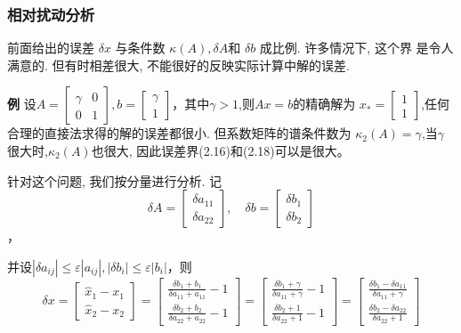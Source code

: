 \documentclass[12pt,a4paper]{article}
\begin{document}
\subsubsection{相对扰动分析}
前面给出的误差 $\delta x$ 与条件数 $\kappa(A), \delta A$和 $\delta b$ 成比例. 许多情况下, 这个界
是令人满意的. 但有时相差很大, 不能很好的反映实际计算中解的误差.

\begin{framed}
	{\bfseries 例} 设$A=\left[\begin{array}{ll}{\gamma} & {0} \\ {0} & {1}\end{array}\right], b=\left[\begin{array}{l}{\gamma} \\ {1}\end{array}\right]$，其中$\gamma > 1$,则$Ax = b$的精确解为
	$x_{*}=\left[\begin{array}{l}{1} \\ {1}\end{array}\right]$,任何合理的直接法求得的解的误差都很小. 但系数矩阵的谱条件数为 $\kappa_{2}(A)=\gamma$,当$\gamma$很大时,$\kappa_{2}(A)$也很大, 因此误差界(2.16)和(2.18)可以是很大。
	
	针对这个问题, 我们按分量进行分析. 记
	\begin{equation}
	\delta A=\left[\begin{array}{c}{\delta a_{11}} \\ {\delta a_{22}}\end{array}\right], \quad \delta b=\left[\begin{array}{c}{\delta b_{1}} \\ {\delta b_{2}}\end{array}\right]
	\end{equation}，
	
	并设$\left|\delta a_{i j}\right| \leq \varepsilon\left|a_{i j}\right|,\left|\delta b_{i}\right| \leq \varepsilon\left|b_{i}\right|$，则
	\begin{equation}
	\delta x=\left[\begin{array}{c}{\hat{x}_{1}-x_{1}} \\ {\hat{x}_{2}-x_{2}}\end{array}\right]=\left[\begin{array}{c}{\frac{\delta b_{1}+b_{1}}{\delta a_{11}+a_{11}}-1} \\ {\frac{\delta b_{2}+b_{2}}{\delta a_{22}+a_{22}}-1}\end{array}\right]=\left[\begin{array}{c}{\frac{\delta b_{1}+\gamma}{\delta a_{11}+\gamma}-1} \\ {\frac{\delta b_{2}+1}{\delta a_{22}+1}-1}\end{array}\right]=\left[\begin{array}{c}{\frac{\delta b_{1}-\delta a_{11}}{\delta a_{11}+\gamma}} \\ {\frac{\delta b_{2}-\delta a_{22}}{\delta a_{22}+1}}\end{array}\right]
	\end{equation}
	

\end{framed}
\end{document}
